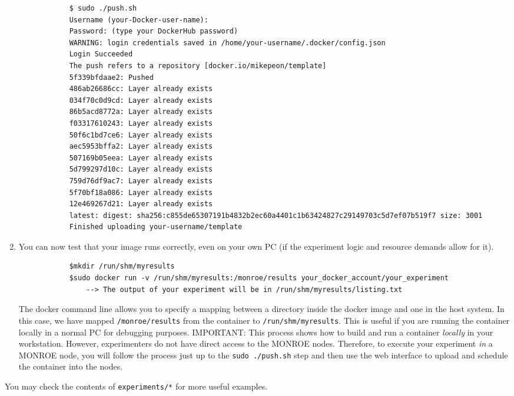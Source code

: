 \documentclass[a4paper,10pt]{article}
\newcommand{\VerbatimFont}{\footnotesize}
\newcommand{\monroe}{MONROE}
\newcommand{\identifier}[1]{{\texttt{\small{#1}}}}
\begin{document}
\begin{enumerate}
		{\VerbatimFont\begin{verbatim}
			$ sudo ./push.sh
			Username (your-Docker-user-name):
			Password: (type your DockerHub password)
			WARNING: login credentials saved in /home/your-username/.docker/config.json
			Login Succeeded
			The push refers to a repository [docker.io/mikepeon/template]
			5f339bfdaae2: Pushed
			486ab26686cc: Layer already exists
			034f70c0d9cd: Layer already exists
			86b5acd8772a: Layer already exists
			f03317610243: Layer already exists
			50f6c1bd7ce6: Layer already exists
			aec5953bffa2: Layer already exists
			507169b05eea: Layer already exists
			5d799297d10c: Layer already exists
			759d76df9ac7: Layer already exists
			5f70bf18a086: Layer already exists
			12e469267d21: Layer already exists
			latest: digest: sha256:c855de65307191b4832b2ec60a4401c1b63424827c29149703c5d7ef07b519f7 size: 3001
			Finished uploading your-username/template
		\end{verbatim}}
	\item You can now test that your image runs correctly, even on your own PC (if the experiment logic and resource demands allow for it).
		{\VerbatimFont\begin{verbatim}
			$mkdir /run/shm/myresults
			$sudo docker run -v /run/shm/myresults:/monroe/results your_docker_account/your_experiment
			    --> The output of your experiment will be in /run/shm/myresults/listing.txt
		\end{verbatim}}
		The docker command line allows you to specify a mapping between a directory inside the docker image and one in the host system.
		In this case, we have mapped \identifier{/monroe/results} from the container to \identifier{/run/shm/my\-results}.
		This is useful if you are running the container locally in a normal PC for debugging purposes.
		IMPORTANT: This process shows how to build and run a container \emph{locally} in your workstation.
		However, experimenters do not have direct access to the \monroe{} nodes.
		Therefore, to execute your experiment \emph{in} a \monroe{} node, you will follow the process just up to the \identifier{sudo ./push.sh} step and then use the web interface to upload and schedule the container into the nodes.
\end{enumerate}

You may check the contents of \identifier{experiments/*} for more useful examples.
\end{document}
